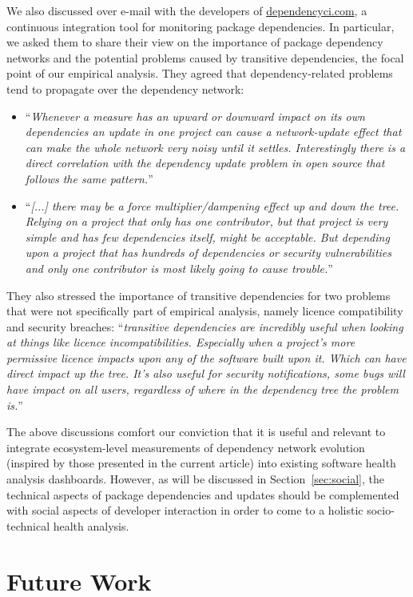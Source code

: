 \documentclass[smallextended]{svjour3}       %
\newcommand{\sect}[1]{Section~\ref{#1}}
\begin{document}
We also discussed over e-mail with the developers of \textsf{\url{dependencyci.com}}, a continuous integration tool for monitoring package dependencies.
In particular, we asked them to share their view on the importance of package dependency networks and the potential problems caused by transitive dependencies, the focal point of our empirical analysis. They agreed that dependency-related problems tend to propagate over the dependency network:
\begin{itemize}
\item ``\textit{Whenever a measure has an upward or downward impact on its own dependencies an update in one project can cause a network-update effect that can make the whole network very noisy until it settles. Interestingly there is a direct correlation with the dependency update problem in open source that follows the same pattern.}'' 
\item ``\textit{[...] there may be a force multiplier/dampening effect up and down the tree. Relying on a project that only has one contributor, but that project is very simple and has few dependencies itself, might be acceptable. But depending upon a project that has hundreds of dependencies or security vulnerabilities and only one contributor is most likely going to cause trouble.}''
\end{itemize}
\noindent They also stressed the importance of transitive dependencies for two problems that were not specifically part of empirical analysis, namely licence compatibility and security breaches: ``\textit{transitive dependencies are incredibly useful when looking at things like licence incompatibilities. Especially when a project's more permissive licence impacts upon any of the software built upon it. Which can have direct impact up the tree. It's also useful for security notifications, some bugs will have impact on all users, regardless of where in the dependency tree the problem is.}'' 

The above discussions comfort our conviction that it is useful and relevant to integrate ecosystem-level measurements of dependency network evolution (inspired by those presented in the current article) into existing software health analysis dashboards. However, as will be discussed in \sect{sec:social}, the technical aspects of package dependencies and updates should be complemented with social aspects of developer interaction in order to come to a holistic socio-technical health analysis.



\section{Future Work}
\label{sec:futurework}
\end{document}
